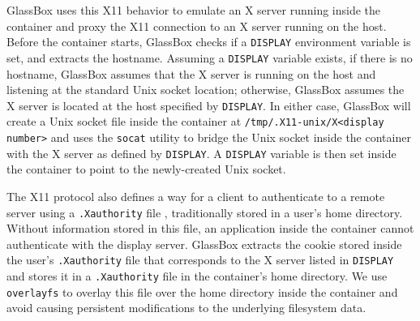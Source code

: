 \documentclass{proc}
\begin{document}
GlassBox uses this X11 behavior to emulate an X server running inside the container and proxy the X11 connection to an X server running on the host. Before the container starts, GlassBox checks if a \texttt{DISPLAY} environment variable is set, and extracts the hostname. Assuming a \texttt{DISPLAY} variable exists, if there is no hostname, GlassBox assumes that the X server is running on the host and listening at the standard Unix socket location; otherwise, GlassBox assumes the X server is located at the host specified by \texttt{DISPLAY}. In either case, GlassBox will create a Unix socket file inside the container at \texttt{/tmp/.X11-unix/X<display number>} and uses the \texttt{socat} utility \cite{socatman} to bridge the Unix socket inside the container with the X server as defined by \texttt{DISPLAY}. A \texttt{DISPLAY} variable is then set inside the container to point to the newly-created Unix socket.

The X11 protocol also defines a way for a client to authenticate to a remote server using a \texttt{.Xauthority} file \cite{xsecurityman}, traditionally stored in a user's home directory. Without information stored in this file, an application inside the container cannot authenticate with the display server. GlassBox extracts the cookie stored inside the user's \texttt{.Xauthority} file that corresponds to the X server listed in \texttt{DISPLAY} and stores it in a \texttt{.Xauthority} file in the container's home directory. We use \texttt{overlayfs} to overlay this file over the home directory inside the container and avoid causing persistent modifications to the underlying filesystem data.
\end{document}
